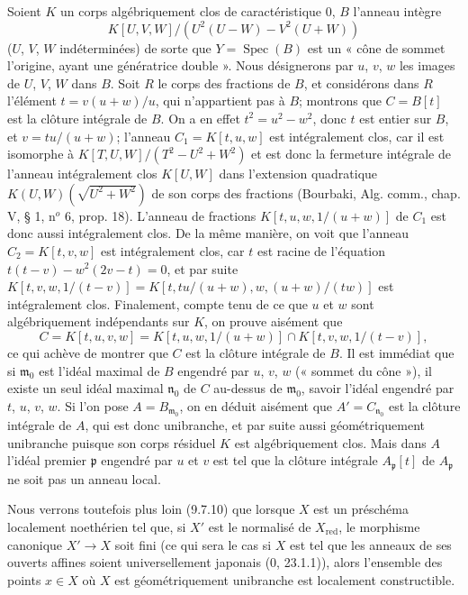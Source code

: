 \documentclass[10pt,oneside]{book}
\newcommand{\oldpage}[2][]{%
  \setcounter{footnote}{0}%
  \marginpar{\scriptsize\textbf{#1}~|~#2}\ignorespaces}
\begin{document}
\oldpage[IV-2]{177}
Soient $K$ un corps algébriquement clos de caractéristique 0, $B$ l'anneau
intègre
\[
K[U,V,W]/(U^2(U-W)-V^2(U+W))
\]
($U$, $V$, $W$ indéterminées) de sorte que $Y=\operatorname{Spec}(B)$ est
un « cône de sommet l'origine, ayant une génératrice double ». Nous
désignerons par $u$, $v$, $w$ les images de $U$, $V$, $W$ dans $B$. Soit
$R$ le corps des fractions de $B$, et considérons dans $R$ l'élément
$t=v(u+w)/u$, qui n'appartient pas à $B$; montrons que $C=B[t]$ est la
clôture intégrale de $B$. On a en effet $t^2=u^2-w^2$, donc $t$ est entier
sur $B$, et $v=tu/(u+w)$; l'anneau $C_1=K[t,u,w]$ est intégralement clos,
car il est isomorphe à
$K[T,U,W]/(T^2-U^2+W^2)$ et est donc la fermeture intégrale de l'anneau
intégralement clos $K[U,W]$ dans l'extension quadratique
$K(U,W)(\sqrt{U^2+W^2})$ de son corps des fractions (Bourbaki, Alg. comm.,
chap. V, § 1, n$^o$ 6, prop. 18). L'anneau de fractions
$K[t,u,w,1/(u+w)]$ de $C_1$ est donc aussi intégralement clos. De la même
manière, on voit que l'anneau $C_2=K[t,v,w]$ est intégralement clos, car
$t$ est racine de l'équation
$t(t-v)-w^2(2v-t)=0$, et par suite
$K[t,v,w,1/(t-v)]=K[t,tu/(u+w),w,(u+w)/(tw)]$ est intégralement clos. Finalement, compte tenu de ce
que $u$ et $w$ sont algébriquement indépendants sur $K$, on prouve aisément
que
\[
C=K[t,u,v,w]=K[t,u,w,1/(u+w)]\cap K[t,v,w,1/(t-v)],
\]
ce qui achève de montrer que $C$ est la clôture intégrale de $B$. Il est
immédiat que si $\mathfrak m_0$ est l'idéal maximal de $B$ engendré par
$u$, $v$, $w$ (« sommet du cône »), il existe un seul idéal maximal
$\mathfrak n_0$ de $C$ au-dessus de $\mathfrak m_0$, savoir l'idéal
engendré par $t$, $u$, $v$, $w$. Si l'on pose $A=B_{\mathfrak m_0}$, on en
déduit aisément que $A'=C_{\mathfrak n_0}$ est la clôture intégrale de
$A$, qui est donc unibranche, et par suite aussi géométriquement unibranche
puisque son corps résiduel $K$ est algébriquement clos. Mais dans $A$
l'idéal premier $\mathfrak p$ engendré par $u$ et $v$ est tel que la
clôture intégrale $A_\mathfrak p[t]$ de $A_\mathfrak p$ ne soit pas un
anneau local.

Nous verrons toutefois plus loin (9.7.10) que lorsque $X$ est un préschéma
localement noethérien tel que, si $X'$ est le normalisé de
$X_{\mathrm{red}}$, le morphisme canonique $X'\to X$ soit fini (ce qui sera
le cas si $X$ est tel que les anneaux de ses ouverts affines soient
universellement japonais (0, 23.1.1)), alors l'ensemble des points $x\in X$
où $X$ est géométriquement unibranche est localement constructible.
\end{document}
